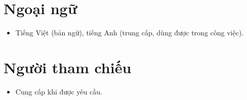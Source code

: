 \documentclass[11pt,a4paper,sans]{moderncv}
\begin{document}

\section{Ngoại ngữ}
\vspace{1pt}
\begin{itemize}
\item {Tiếng Việt (bản ngữ), tiếng Anh (trung cấp, dùng được trong công việc).}
\end{itemize}


\section{Người tham chiếu}
\vspace{1pt}
\begin{itemize}
\item{Cung cấp khi được yêu cầu.}
\end{itemize}
\end{document}
